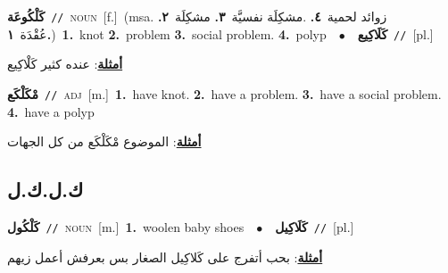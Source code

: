 \documentclass[10pt,a4paper,twoside]{article} %
\begin{document}
\begin{multicols}{2}
{\setlength\topsep{0pt}\textbf{\foreignlanguage{arabic}{كَلْكُوعَة}}\ {\color{gray}\texttt{//}\color{black}}\ \textsc{noun}\ [f.]\ \color{gray}(msa. \foreignlanguage{arabic}{زوائد لحمية}~\foreignlanguage{arabic}{\textbf{٤.}}  .\foreignlanguage{arabic}{مشكِلَة نفسيَّة}~\foreignlanguage{arabic}{\textbf{٣.}}  \foreignlanguage{arabic}{مشكِلَة}~\foreignlanguage{arabic}{\textbf{٢.}}  \foreignlanguage{arabic}{عُقْدَة}~\foreignlanguage{arabic}{\textbf{١.}})\color{black}\ \textbf{1.}~knot  \textbf{2.}~problem  \textbf{3.}~social problem.  \textbf{4.}~polyp\ \ $\bullet$\ \ \setlength\topsep{0pt}\textbf{\foreignlanguage{arabic}{كَلَاكِيع}}\ {\color{gray}\texttt{//}\color{black}}\ [pl.]\  \begin{flushright}\color{gray}\foreignlanguage{arabic}{\textbf{\underline{\foreignlanguage{arabic}{أمثلة}}}: عنده كثير كَلْاكِيع}\end{flushright}\color{black}} \vspace{2mm}

{\setlength\topsep{0pt}\textbf{\foreignlanguage{arabic}{مْكَلْكَع}}\ {\color{gray}\texttt{//}\color{black}}\ \textsc{adj}\ [m.]\ \textbf{1.}~have knot.  \textbf{2.}~have a problem.  \textbf{3.}~have a social problem.  \textbf{4.}~have a polyp\  \begin{flushright}\color{gray}\foreignlanguage{arabic}{\textbf{\underline{\foreignlanguage{arabic}{أمثلة}}}: الموضوع مْكَلْكَع من كل الجهات}\end{flushright}\color{black}} \vspace{2mm}

\vspace{-3mm}
\subsection*{\color{blue}\foreignlanguage{arabic}{ك.ل.ك.ل}\color{blue}{}} 

{\setlength\topsep{0pt}\textbf{\foreignlanguage{arabic}{كَلْكُول}}\ {\color{gray}\texttt{//}\color{black}}\ \textsc{noun}\ [m.]\ \textbf{1.}~woolen baby shoes\ \ $\bullet$\ \ \setlength\topsep{0pt}\textbf{\foreignlanguage{arabic}{كَلَاكِيل}}\ {\color{gray}\texttt{//}\color{black}}\ [pl.]\  \begin{flushright}\color{gray}\foreignlanguage{arabic}{\textbf{\underline{\foreignlanguage{arabic}{أمثلة}}}: بحب أتفرج على كَلاكِيل الصغار بس بعرفش أعمل زيهم}\end{flushright}\color{black}} \vspace{2mm}


\end{multicols}
\end{document}

